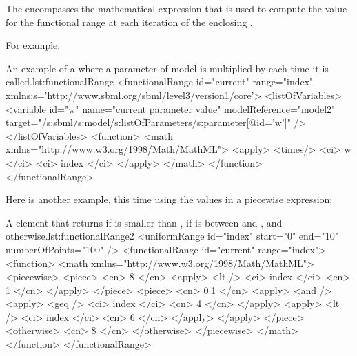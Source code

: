 The  encompasses the mathematical expression that is used to compute the value for the functional range at each iteration of the enclosing .

For example:

\begin{myXmlLst}{An example of a  where a parameter  of model  is multiplied by  each time it is called.}{lst:functionalRange}
  <functionalRange id="current" range="index"
      xmlns:s='http://www.sbml.org/sbml/level3/version1/core'>
    <listOfVariables>
      <variable id="w" name="current parameter value" modelReference="model2"
          target="/s:sbml/s:model/s:listOfParameters/s:parameter[@id='w']" />
    </listOfVariables>
    <function>
      <math xmlns="http://www.w3.org/1998/Math/MathML">
        <apply>
          <times/>
          <ci> w </ci>
          <ci> index </ci>
        </apply>
      </math>
    </function>
  </functionalRange>
\end{myXmlLst}

Here is another example, this time using the values in a piecewise expression: 

\begin{myXmlLst}{A  element that returns  if  is smaller than ,  if  is between  and , and  otherwise.}{lst:functionalRange2}
        <uniformRange id="index" start="0" end="10" numberOfPoints="100" />
        <functionalRange id="current" range="index">
          <function>
            <math xmlns="http://www.w3.org/1998/Math/MathML">
              <piecewise>
                <piece>
                  <cn> 8 </cn>
                  <apply>
                    <lt />
                    <ci> index </ci>
                    <cn> 1 </cn>
                  </apply>
                </piece>
                <piece>
                  <cn> 0.1 </cn>
                  <apply>
                    <and />
                    <apply>
                      <geq />
                      <ci> index </ci>
                      <cn> 4 </cn>
                    </apply>
                    <apply>
                      <lt />
                      <ci> index </ci>
                      <cn> 6 </cn>
                    </apply>
                  </apply>
                </piece>
                <otherwise>
                  <cn> 8 </cn>
                </otherwise>
              </piecewise>
            </math>
          </function>
        </functionalRange>
\end{myXmlLst}



